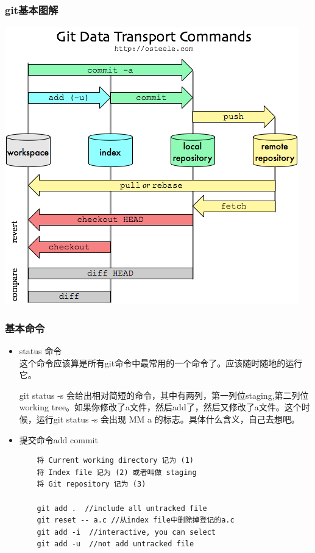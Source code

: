 \documentclass[a4paper,12pt,twoside]{book}
\begin{document}
\begin{CJK*}{UTF8}{song}
\subsubsection{git基本图解}
 \includegraphics[scale=0.8]{pics/git-transport} \\

\subsubsection{基本命令}
\begin{itemize}
\item status 命令 \\
    这个命令应该算是所有git命令中最常用的一个命令了。应该随时随地的运行它。\par
    git status -s 会给出相对简短的命令，其中有两列，第一列位staging,第二列位working tree。如果你修改了a文件，然后add了，然后又修改了a文件。这个时候，运行git status -s
    会出现 MM a 的标志。具体什么含义，自己去想吧。

\item 提交命令add commit
    \begin{verbatim}
    将 Current working directory 记为 (1)
    将 Index file 记为 (2) 或者叫做 staging
    将 Git repository 记为 (3)

    git add .  //include all untracked file
    git reset -- a.c //从index file中删除掉登记的a.c
    git add -i  //interactive, you can select
    git add -u  //not add untracked file


\end{verbatim}
\end{itemize}
\end{CJK*}
\end{document}

